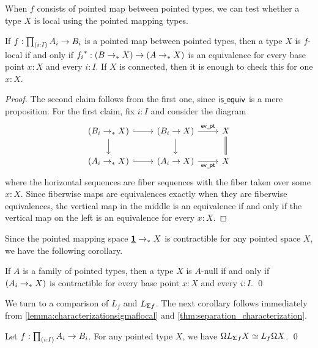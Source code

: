 When $f$ consists of pointed map between pointed types, we can test whether
a type $X$ is local using the pointed mapping types.

\begin{lem}\label{lemma:pointed}
    If $f : \prd{i:I} A_i \to B_i$ is a pointed map between pointed types,
    then a type $X$ is $f$-local if and only if
    ${f_i}^\ast : (B \to_{\ast} X) \to (A \to_{\ast} X)$ is an equivalence
    for every base point $x : X$ and every $i : I$.
    If $X$ is connected, then it is enough to check this for one $x : X$.
\end{lem}

\begin{proof}
    The second claim follows from the first one, since
    $\mathsf{is\underline{\ }{}equiv}$ is a mere proposition.
    For the first claim, fix $i : I$ and consider the diagram
\begin{equation*}
\begin{tikzcd}
(B_i \to_\ast X) \arrow[d] \arrow[r,hookrightarrow] & (B_i\to X) \arrow[d] \arrow[r,"\evpt"] & X \arrow[d,equals] \\
(A_i \to_\ast X) \arrow[r,hookrightarrow] & (A_i \to X) \arrow[r,swap,"\evpt"] & X
\end{tikzcd}
\end{equation*}
    where the horizontal sequences are fiber sequences with the fiber taken over
    some $x : X$. Since fiberwise maps are equivalences exactly when they are fiberwise
    equivalences, the vertical map in the middle is an equivalence if and
    only if the vertical map on the left is an equivalence for every $x : X$.
\end{proof}

Since the pointed mapping space $\underline{\mathbf{1}}\to_\ast X$ is contractible for any pointed space $X$, we have the following corollary.

\begin{cor}\label{cor:pointed_null}
If $A$ is a family of pointed types, then a type $X$ is $A$-null
if and only if $(A_i \to_{\ast} X)$ is contractible
for every base point $x : X$ and every $i : I$. \qed
\end{cor}

We turn to a comparison of $L_f$ and $L_{\mathsf{\Sigma} f}$.
The next corollary follows immediately from \cref{lemma:characterizationsigmaflocal}
and \cref{thm:separation_characterization}.

\begin{cor}\label{remark:commutativitylooplocalization}
    Let $f : \prd{i:I} A_i \to B_i$.
    For any pointed type $X$, we have
    $\mathsf{\Omega} L_{\mathsf{\Sigma}^{}{f}} X \simeq L_f \mathsf{\Omega} X$. \qed
\end{cor}

